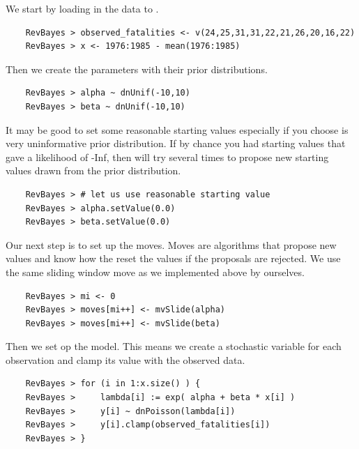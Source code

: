 \documentclass[11pt]{article}
\begin{document}
We start by loading in the data to \RevBayes.
{\tt \begin{snugshade*}
\begin{lstlisting} 
    RevBayes > observed_fatalities <- v(24,25,31,31,22,21,26,20,16,22)
    RevBayes > x <- 1976:1985 - mean(1976:1985)
\end{lstlisting}
\end{snugshade*}}
Then we create the parameters with their prior distributions.
{\tt \begin{snugshade*}
\begin{lstlisting} 
    RevBayes > alpha ~ dnUnif(-10,10) 
    RevBayes > beta ~ dnUnif(-10,10)
\end{lstlisting}
\end{snugshade*}}
It may be good to set some reasonable starting values especially if you choose is very uninformative prior distribution.
If by chance you had starting values that gave a likelihood of -Inf, then \RevBayes will try several times to propose new starting values drawn from the prior distribution.
{\tt \begin{snugshade*}
\begin{lstlisting} 
    RevBayes > # let us use reasonable starting value
    RevBayes > alpha.setValue(0.0)
    RevBayes > beta.setValue(0.0)
\end{lstlisting}
\end{snugshade*}}
Our next step is to set up the moves.
Moves are algorithms that propose new values and know how the reset the values if the proposals are rejected.
We use the same sliding window move as we implemented above by ourselves.
{\tt \begin{snugshade*}
\begin{lstlisting} 
    RevBayes > mi <- 0
    RevBayes > moves[mi++] <- mvSlide(alpha)
    RevBayes > moves[mi++] <- mvSlide(beta)
\end{lstlisting}
\end{snugshade*}}
Then we set op the model.
This means we create a stochastic variable for each observation and clamp its value with the observed data.
{\tt \begin{snugshade*}
\begin{lstlisting} 
    RevBayes > for (i in 1:x.size() ) {
    RevBayes >     lambda[i] := exp( alpha + beta * x[i] )
    RevBayes >     y[i] ~ dnPoisson(lambda[i])
    RevBayes >     y[i].clamp(observed_fatalities[i])
    RevBayes > }
\end{lstlisting}
\end{snugshade*}}
\end{document}
